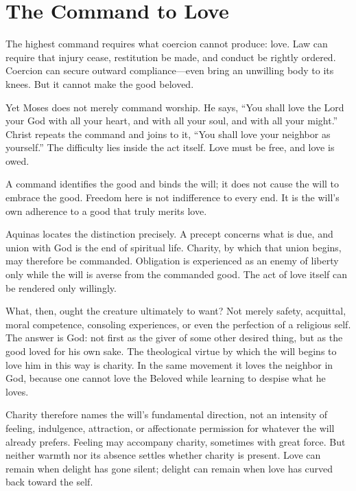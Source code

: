 \section{The Command to Love}

The highest command requires what coercion cannot produce: love. Law can require that injury cease, restitution be made, and conduct be rightly ordered. Coercion can secure outward compliance---even bring an unwilling body to its knees. But it cannot make the good beloved.

Yet Moses does not merely command worship. He says, ``You shall love the Lord your God with all your heart, and with all your soul, and with all your might.'' Christ repeats the command and joins to it, ``You shall love your neighbor as yourself.'' The difficulty lies inside the act itself. Love must be free, and love is owed.

A command identifies the good and binds the will; it does not cause the will to embrace the good. Freedom here is not indifference to every end. It is the will's own adherence to a good that truly merits love.

Aquinas locates the distinction precisely. A precept concerns what is due, and union with God is the end of spiritual life. Charity, by which that union begins, may therefore be commanded. Obligation is experienced as an enemy of liberty only while the will is averse from the commanded good. The act of love itself can be rendered only willingly.

What, then, ought the creature ultimately to want? Not merely safety, acquittal, moral competence, consoling experiences, or even the perfection of a religious self. The answer is God: not first as the giver of some other desired thing, but as the good loved for his own sake. The theological virtue by which the will begins to love him in this way is charity. In the same movement it loves the neighbor in God, because one cannot love the Beloved while learning to despise what he loves.

Charity therefore names the will's fundamental direction, not an intensity of feeling, indulgence, attraction, or affectionate permission for whatever the will already prefers. Feeling may accompany charity, sometimes with great force. But neither warmth nor its absence settles whether charity is present. Love can remain when delight has gone silent; delight can remain when love has curved back toward the self.

